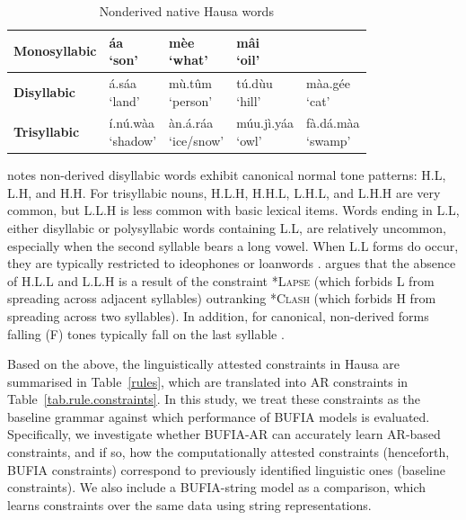 \documentclass{CUP-JNL-PHO}%
\theoremstyle{definition}
\numberwithin{equation}{section}
\theoremstyle{definition}
\begin{document}
\begin{table}[h!]
	\centering
	\renewcommand{\arraystretch}{2}
	\begin{tabular}{lllll}
		\hline
		
		\textbf{Monosyllabic} 
		& \makecell{\textipa{\texthtd}áa \\ `son’} 
		& \makecell{mèe \\ `what’} 
		& \makecell{mâi \\ `oil’} 
		
		&  \\ \hline
		\textbf{Disyllabic} 
		& \makecell{\textipa{\texthtk}á.sáa \\ `land’} 
		& \makecell{mù.tûm \\ `person’} 
		& \makecell{tú.dùu \\ `hill’} 
		& \makecell{màa.gée \\ `cat’}  \\
		\hline
		
		\textbf{Trisyllabic} 
		& \makecell{í.nú.wàa \\ `shadow’} 
		& \makecell{\textipa{\texthtk}àn.\textipa{\texthtk}á.ráa \\ `ice/snow’} 
		& \makecell{múu.jì.yáa \\ `owl'} 
		& \makecell{fà.dá.màa\\ `swamp'} \\ \hline
	\end{tabular}
	\caption{Nonderived native Hausa words \citep{wold-4}}
	\label{ex.hausa.words}
\end{table}

\citet[p.606]{Newmanbook} notes
non-derived disyllabic words exhibit canonical normal tone
patterns: H.L, L.H, and H.H. For trisyllabic nouns, H.L.H,
H.H.L, L.H.L, and L.H.H are very common, but L.L.H is less
common with basic lexical items. Words ending in L.L, either 
disyllabic or polysyllabic words containing L.L, are relatively uncommon, 
especially when the second syllable bears a long vowel. 
When L.L forms do occur, they are typically restricted to 
ideophones or loanwords \citep[p.606]{Newmanbook}. 
\citet{zoll2003optimal} argues that the absence of H.L.L
and L.L.H is a result of the constraint \textsc{*Lapse} (which
forbids L from spreading across adjacent syllables) outranking
\textsc{*Clash} (which forbids H from spreading across two syllables).
In addition, for canonical, non-derived forms falling (F) tones 
typically fall on the last syllable \citep[p.606]{Newmanbook}.

Based on the above, the linguistically attested constraints in Hausa 
are summarised in Table~\ref{rules}, which are translated into 
AR constraints in Table~\ref{tab.rule.constraints}. In this 
study, we treat these constraints as the baseline grammar against which 
performance of BUFIA models is evaluated. Specifically, we investigate 
whether BUFIA-AR can accurately learn AR-based constraints, and 
if so, how the computationally attested constraints (henceforth, 
BUFIA constraints) correspond to previously identified linguistic 
ones (baseline constraints). We also include a BUFIA-string model 
as a comparison, which learns constraints over the same 
data using string representations.
\end{document}
